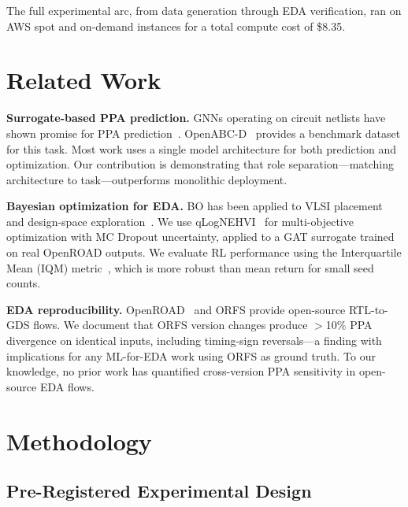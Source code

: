 \documentclass[conference]{IEEEtran}
\begin{document}
The full experimental arc, from data generation through EDA verification, ran on AWS
spot and on-demand instances for a total compute cost of \$8.35.

\section{Related Work}

\textbf{Surrogate-based PPA prediction.}
GNNs operating on circuit netlists have shown promise for PPA
prediction~\cite{ustun2020,huang2021,wu2022,chhabria2022}. OpenABC-D~\cite{chowdhury2021}
provides a benchmark dataset for this task. Most work uses a single model architecture
for both prediction and optimization. Our contribution is demonstrating that role
separation—matching architecture to task—outperforms monolithic deployment.

\textbf{Bayesian optimization for EDA.}
BO has been applied to VLSI placement~\cite{agnesina2020} and design-space
exploration~\cite{nardi2019}. We use qLogNEHVI~\cite{daulton2021,ament2024} for multi-objective
optimization with MC Dropout uncertainty, applied to a GAT surrogate trained on real
OpenROAD outputs. We evaluate RL performance using the Interquartile Mean (IQM)
metric~\cite{agarwal2021}, which is more robust than mean return for small seed counts.

\textbf{EDA reproducibility.}
OpenROAD~\cite{openroad2019} and ORFS provide open-source RTL-to-GDS flows.
We document that ORFS version changes produce $>$10\% PPA divergence on identical
inputs, including timing-sign reversals—a finding with implications for any ML-for-EDA
work using ORFS as ground truth. To our knowledge, no prior work has quantified
cross-version PPA sensitivity in open-source EDA flows.

\section{Methodology}
\label{sec:method}

\subsection{Pre-Registered Experimental Design}
\end{document}
